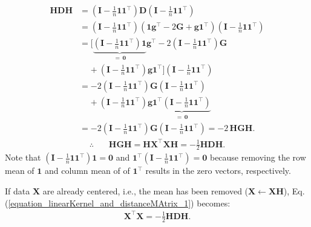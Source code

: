 \documentclass[lang=cn,10pt]{gorgeousnbook}
\numberwithin{equation}{section}%
\numberwithin{figure}{section}%
\begin{document}
\begin{align*}
\boldsymbol{HDH} &= (\boldsymbol{I} - \frac{1}{n}\boldsymbol{1}\boldsymbol{1}^\top) \boldsymbol{D} (\boldsymbol{I} - \frac{1}{n}\boldsymbol{1}\boldsymbol{1}^\top) \\
&= (\boldsymbol{I} - \frac{1}{n}\boldsymbol{1}\boldsymbol{1}^\top) (\boldsymbol{1}\boldsymbol{g}^\top -2 \boldsymbol{G} + \boldsymbol{g}\boldsymbol{1}^\top) (\boldsymbol{I} - \frac{1}{n}\boldsymbol{1}\boldsymbol{1}^\top) \\
&= \big[\underbrace{(\boldsymbol{I} - \frac{1}{n}\boldsymbol{1}\boldsymbol{1}^\top)\boldsymbol{1}}_{=\,\boldsymbol{0}} \boldsymbol{g}^\top -2 (\boldsymbol{I} - \frac{1}{n}\boldsymbol{1}\boldsymbol{1}^\top)\boldsymbol{G}\\ 
&~~~~~ + (\boldsymbol{I} - \frac{1}{n}\boldsymbol{1}\boldsymbol{1}^\top)\boldsymbol{g}\boldsymbol{1}^\top\big] (\boldsymbol{I} - \frac{1}{n}\boldsymbol{1}\boldsymbol{1}^\top) \\
&= -2 (\boldsymbol{I} - \frac{1}{n}\boldsymbol{1}\boldsymbol{1}^\top)\boldsymbol{G}(\boldsymbol{I} - \frac{1}{n}\boldsymbol{1}\boldsymbol{1}^\top) \\
&~~~~~ + (\boldsymbol{I} - \frac{1}{n}\boldsymbol{1}\boldsymbol{1}^\top)\boldsymbol{g}\underbrace{\boldsymbol{1}^\top(\boldsymbol{I} - \frac{1}{n}\boldsymbol{1}\boldsymbol{1}^\top)}_{=\,\boldsymbol{0}} \\
&= -2 (\boldsymbol{I} - \frac{1}{n}\boldsymbol{1}\boldsymbol{1}^\top)\boldsymbol{G}(\boldsymbol{I} - \frac{1}{n}\boldsymbol{1}\boldsymbol{1}^\top) = -2\,\boldsymbol{HGH}.
\end{align*}
\begin{align}\label{equation_linearKernel_and_distanceMAtrix_1}
\therefore~~~~~~~~ \boldsymbol{HGH} = \boldsymbol{H}\boldsymbol{X}^\top\boldsymbol{X}\boldsymbol{H} = -\frac{1}{2} \boldsymbol{HDH}.
\end{align}
Note that $(\boldsymbol{I} - \frac{1}{n}\boldsymbol{1}\boldsymbol{1}^\top)\boldsymbol{1} = \boldsymbol{0}$ and $\boldsymbol{1}^\top(\boldsymbol{I} - \frac{1}{n}\boldsymbol{1}\boldsymbol{1}^\top) = \boldsymbol{0}$ because removing the row mean of $\boldsymbol{1}$ and column mean of of $\boldsymbol{1}^\top$ results in the zero vectors, respectively. 


If data $\boldsymbol{X}$ are already centered, i.e., the mean has been removed ($\boldsymbol{X} \gets \boldsymbol{X}\boldsymbol{H}$), Eq. (\ref{equation_linearKernel_and_distanceMAtrix_1}) becomes:
\begin{align}\label{equation_linearKernel_and_distanceMAtrix_2}
\boldsymbol{X}^\top\boldsymbol{X} = -\frac{1}{2} \boldsymbol{HDH}.
\end{align}
\end{document}
